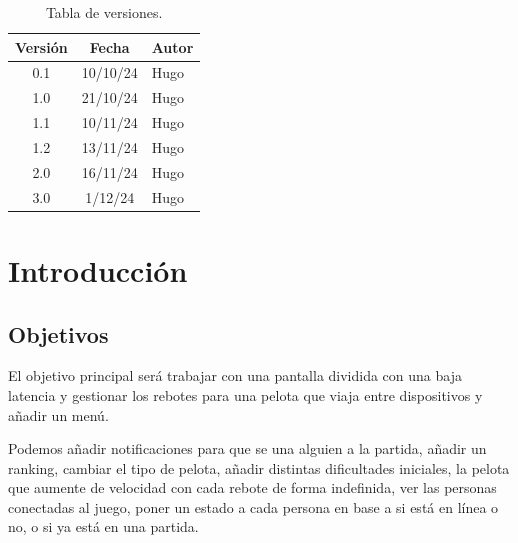 \documentclass[a4paper,openright,12pt]{article}
\begin{document}

\tableofcontents

\vspace{5cm}

\begin{flushright}
\begin{table}[hbtp]
\begin{center}

\caption{Tabla de versiones.}
\label{tabla:versiones}
\small
\vspace{1ex}

\begin{tabular}{|c|c|l|}
\hline
Versión & Fecha & Autor \\
\hline \hline
0.1 & 10/10/24 & Hugo\\ \hline
1.0 & 21/10/24 & Hugo\\ \hline
1.1 & 10/11/24 & Hugo\\ \hline
1.2 & 13/11/24 & Hugo\\ \hline
2.0 & 16/11/24 & Hugo\\ \hline
3.0 &  1/12/24 & Hugo\\ \hline

\end{tabular}

\end{center}
\end{table}
\end{flushright}

\newpage
{}


\section{Introducción}\label{cap.introduccion}

\subsection{Objetivos}
El objetivo principal será trabajar con una pantalla dividida con una baja latencia y gestionar los rebotes para una pelota que viaja entre dispositivos y añadir un menú.

Podemos añadir notificaciones para que se una alguien a la partida, añadir un ranking, cambiar el tipo de pelota, añadir distintas dificultades iniciales, la pelota que aumente de velocidad con cada rebote de forma indefinida, ver las personas conectadas al juego, poner un estado a cada persona en base a si está en línea o no, o si ya está en una partida.
\end{document}
